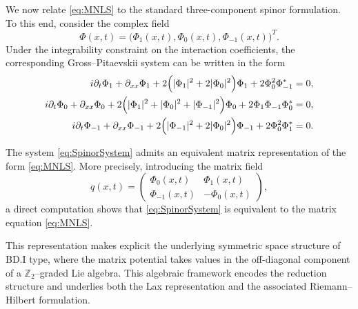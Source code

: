 \documentclass[11pt]{amsart}
\theoremstyle{definition}
\numberwithin{equation}{section}
\begin{document}
We now relate \eqref{eq:MNLS} to the standard three-component spinor formulation. To this end, consider the complex field
\[
\Phi(x,t)=\bigl(\Phi_1(x,t),\Phi_0(x,t),\Phi_{-1}(x,t)\bigr)^T.
\]
Under the integrability constraint on the interaction coefficients, the corresponding Gross--Pitaevskii system can be written in the form
\begin{equation}
\begin{aligned}
i\partial_t \Phi_1 + \partial_{xx}\Phi_1 + 2\Bigl(|\Phi_1|^2 + 2|\Phi_0|^2\Bigr)\Phi_1 + 2\Phi_0^2 \Phi_{-1}^* &= 0, \\
i\partial_t \Phi_0 + \partial_{xx}\Phi_0 + 2\Bigl(|\Phi_1|^2 + |\Phi_0|^2 + |\Phi_{-1}|^2\Bigr)\Phi_0 + 2\Phi_1 \Phi_{-1}\Phi_0^* &= 0, \\
i\partial_t \Phi_{-1} + \partial_{xx}\Phi_{-1} + 2\Bigl(|\Phi_{-1}|^2 + 2|\Phi_0|^2\Bigr)\Phi_{-1} + 2\Phi_0^2 \Phi_1^* &= 0.
\end{aligned}
\label{eq:SpinorSystem}
\end{equation}

The system \eqref{eq:SpinorSystem} admits an equivalent matrix representation of the form \eqref{eq:MNLS}. More precisely, introducing the matrix field
\begin{equation}
q(x,t)=
\begin{pmatrix}
\Phi_0(x,t) & \Phi_1(x,t) \\
\Phi_{-1}(x,t) & -\Phi_0(x,t)
\end{pmatrix},
\label{eq:qmatrix}
\end{equation}
a direct computation shows that \eqref{eq:SpinorSystem} is equivalent to the matrix equation \eqref{eq:MNLS}.

This representation makes explicit the underlying symmetric space structure of BD.I type, where the matrix potential takes values in the off-diagonal component of a $\mathbb{Z}_2$--graded Lie algebra. This algebraic framework encodes the reduction structure and underlies both the Lax representation and the associated Riemann--Hilbert formulation.
\end{document}
